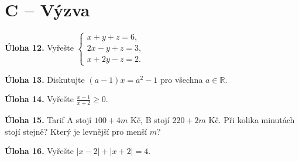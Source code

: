 \documentclass[11pt,a4paper]{article}
\begin{document}
\section*{C -- Výzva}
\noindent\textbf{Úloha 12.} Vyřešte $\begin{cases}x+y+z=6,\\2x-y+z=3,\\x+2y-z=2.\end{cases}$\par\vspace{6mm}
\noindent\textbf{Úloha 13.} Diskutujte $(a-1)x=a^2-1$ pro všechna $a\in\mathbb R$.\par\vspace{6mm}
\noindent\textbf{Úloha 14.} Vyřešte $\frac{x-1}{x+2}\ge0$.\par\vspace{6mm}
\noindent\textbf{Úloha 15.} Tarif A stojí $100+4m$ Kč, B stojí $220+2m$ Kč. Při kolika minutách stojí stejně? Který je levnější pro menší $m$?\par\vspace{6mm}
\noindent\textbf{Úloha 16.} Vyřešte $|x-2|+|x+2|=4$.\par\vspace{6mm}
\end{document}
